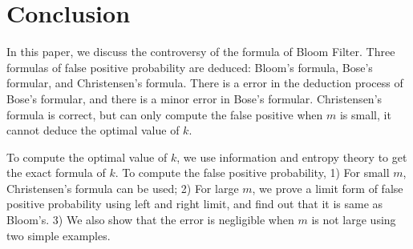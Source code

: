 \section{Conclusion}
In this paper, we discuss the controversy of the formula of Bloom Filter. Three formulas of false positive probability are deduced: Bloom's formula, Bose's formular, and Christensen's formula. There is a error in the deduction process of Bose's formular, and there is a minor error in Bose's formular.  Christensen's formula is correct, but can only compute the false positive when $m$ is small, it cannot deduce the optimal value of $k$.


To compute the optimal value of $k$, we use information and entropy theory to get the exact formula of $k$.
To compute the false positive probability, 1) For small $m$, Christensen's formula can be used; 2)
For large $m$, we
prove a limit form of false positive probability using left and right limit, and find out that it is same as Bloom's. 
3) We also show that the error is negligible when $m$ is not large using two simple examples.